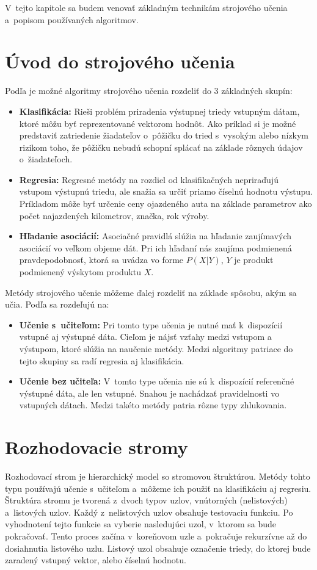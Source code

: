 V~tejto kapitole sa budem venovať základným technikám strojového učenia a~popisom používaných algoritmov. 

\section{Úvod do strojového učenia}

Podľa \cite{alpaydin} je možné algoritmy strojového učenia rozdeliť do 3 základných skupín:
\begin{itemize}
	\item \textbf{Klasifikácia:} Rieši problém priradenia výstupnej triedy vstupným dátam, ktoré môžu byť reprezentované vektorom hodnôt. Ako príklad si je možné predstaviť zatriedenie žiadateľov o~pôžičku do tried s~vysokým alebo nízkym rizikom toho, že pôžičku nebudú schopní splácať na základe rôznych údajov o~žiadateľoch.
	\item \textbf{Regresia:} Regresné metódy na rozdiel od klasifikačných nepriraďujú vstupom výstupnú triedu, ale snažia sa určiť priamo číselnú hodnotu výstupu. Príkladom môže byť určenie ceny ojazdeného auta na základe parametrov ako počet najazdených kilometrov, značka, rok výroby.
	\item \textbf{Hľadanie asociácií:} Asociačné pravidlá slúžia na hľadanie zaujímavých asociácií vo veľkom objeme dát. Pri ich hľadaní nás zaujíma podmienená pravdepodobnosť, ktorá sa uvádza vo forme $P(X|Y)$, $Y$ je produkt podmienený výskytom produktu $X$. 
\end{itemize}

\newpage
Metódy strojového učenie môžeme ďalej rozdeliť na základe spôsobu, akým sa učia. Podľa \cite{alpaydin} sa rozdeľujú na:
\begin{itemize}
	\item \textbf{Učenie s~učiteľom:} Pri tomto type učenia je nutné mať k~dispozícií vstupné aj výstupné dáta. Cieľom je nájsť vzťahy medzi vstupom a výstupom, ktoré slúžia na naučenie metódy. Medzi algoritmy patriace do tejto skupiny sa radí regresia aj klasifikácia.
	\item \textbf{Učenie bez učiteľa:} V~tomto type učenia nie sú k~dispozícií referenčné výstupné dáta, ale len vstupné. Snahou je nachádzať pravidelnosti vo vstupných dátach. Medzi takéto metódy patria rôzne typy zhlukovania. 
\end{itemize}

\section {Rozhodovacie stromy}
Rozhodovací strom je hierarchický model so stromovou štruktúrou. Metódy tohto typu používajú učenie s~učiteľom a~môžeme ich použiť na klasifikáciu aj regresiu. Štruktúra stromu je tvorená z~dvoch typov uzlov, vnútorných (nelistových) a~listových uzlov. Každý z~nelistových uzlov obsahuje testovaciu funkciu. Po vyhodnotení tejto funkcie sa vyberie nasledujúci uzol, v~ktorom sa bude pokračovať. Tento proces začína v~koreňovom uzle a~pokračuje rekurzívne až do dosiahnutia listového uzlu. Listový uzol obsahuje označenie triedy, do ktorej bude zaradený vstupný vektor, alebo číselnú hodnotu.

